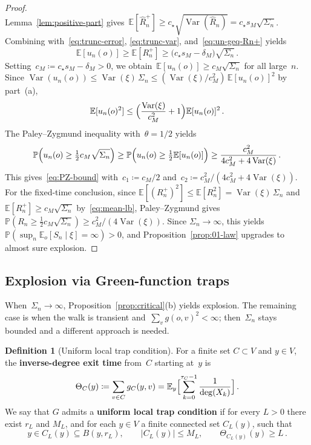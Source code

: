 \documentclass[aop]{imsart}
\theoremstyle{plain}
\theoremstyle{definition}
\newtheorem{definition}[theorem]{Definition}
\newcommand{\E}{\mathbb{E}}
\renewcommand{\P}{\mathbb{P}}
\DeclareMathOperator{\var}{Var}
\begin{document}
\begin{proof}
\[		\]
		Lemma~\ref{lem:positive-part} gives~$\E[\hat R_n^+]\geq c_\star\sqrt{\var(\hat R_n)}= c_\star s_M\sqrt{\Sigma_n}$.
		Combining with~\eqref{eq:trunc-error}, \eqref{eq:trunc-var}, and~\eqref{eq:un-geq-Rn+} yields
		\begin{equation}\label{eq:mean-lb}
			\E[u_n(o)]\geq\E[R_n^+]
			\geq\bigl(c_\star s_M-\delta_M\bigr)\sqrt{\Sigma_n}\,.
		\end{equation}
		Setting~$c_M\coloneqq c_\star s_M-\delta_M>0$, we obtain~$\E[u_n(o)]\geq c_M\sqrt{\Sigma_n}$ for all large~$n$. Since $\var(u_n(o))\leq\var(\xi)\,\Sigma_n\leq(\var(\xi)/c_M^2)\,\E[u_n(o)]^2$ by part~(a),
		\[
		\E[u_n(o)^2]\leq\Bigl(\frac{\var(\xi)}{c_M^2}+1\Bigr)\E[u_n(o)]^2\,.
		\]
		The Paley--Zygmund inequality with~$\theta=1/2$ yields
		\[
		\P\Bigl(u_n(o)\geq\tfrac{1}{2}c_M\sqrt{\Sigma_n}\Bigr)
		\geq\P\Bigl(u_n(o)\geq\tfrac{1}{2}\E[u_n(o)]\Bigr)
		\geq\frac{c_M^2}{4c_M^2+4\var(\xi)}\,.
		\]
		This gives~\eqref{eq:PZ-bound} with~$c_1\coloneqq c_M/2$ and~$c_2\coloneqq c_M^2/(4c_M^2+4\var(\xi))$.
		For the fixed-time conclusion, since $\E[(R_n^+)^2]\leq\E[R_n^2]=\var(\xi)\,\Sigma_n$ and $\E[R_n^+]\geq c_M\sqrt{\Sigma_n}$ by~\eqref{eq:mean-lb}, Paley--Zygmund gives $\P(R_n\geq\tfrac{1}{2}c_M\sqrt{\Sigma_n})\geq c_M^2/(4\var(\xi))$. Since $\Sigma_n\to\infty$, this yields $\P(\sup_n\E_o[S_n\mid\xi]=\infty)>0$, and Proposition~\ref{prop:01-law} upgrades to almost sure explosion.
	\end{proof}
	
	
	\subsection{Explosion via Green-function traps}
	When~$\Sigma_n\to\infty$, Proposition~\ref{prop:critical}(b) yields explosion.
	The remaining case is when the walk is transient and~$\sum_v g(o,v)^2<\infty$; then~$\Sigma_n$ stays bounded and a different approach is needed.
	
	\begin{definition}[Uniform local trap condition]\label{def:trap-family}
		For a finite set $C\subset V$ and $y\in V$, the \textbf{inverse-degree exit time} from~$C$ starting at~$y$ is
		\[
		\Theta_C(y)\coloneqq\sum_{v\in C}g_C(y,v)=\E_y\Bigl[\sum_{k=0}^{\tau_C-1}\frac{1}{\deg(X_k)}\Bigr]\,.
		\]
		We say that $G$ admits a \textbf{uniform local trap condition} if for every $L>0$ there exist $r_L$ and $M_L$, and for each $y\in V$ a finite connected set $C_L(y)$, such that
		\[
		y\in C_L(y)\subseteq B(y,r_L),\qquad |C_L(y)|\leq M_L,\qquad\Theta_{C_L(y)}(y)\geq L\,.
		\]
	\end{definition}
	
\end{document}
